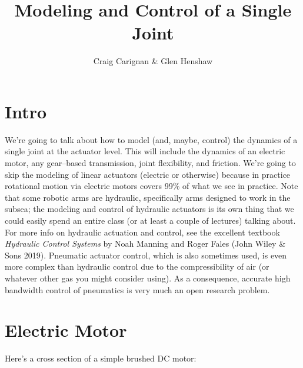 \documentclass[]{article}
\title{Modeling and Control of a Single Joint}
\author{Craig Carignan \& Glen Henshaw}
\begin{document}
\maketitle

\section{Intro}
We're going to talk about how to model (and, maybe, control) the dynamics of a single joint at the actuator level. This will include the dynamics of an electric motor, any gear--based transmission, joint flexibility, and friction. We're going to skip the modeling of linear actuators (electric or otherwise) because in practice rotational motion via electric motors covers 99\% of what we see in practice. Note that some robotic arms are hydraulic, specifically arms designed to work in the subsea; the modeling and control of hydraulic actuators is its own thing that we could easily spend an entire class (or at least a couple of lectures) talking about. For more info on hydraulic actuation and control, see the excellent textbook \textit{Hydraulic Control Systems} by Noah Manning and Roger Fales (John Wiley \& Sons 2019). Pneumatic actuator control, which is also sometimes used, is even more complex than hydraulic control due to the compressibility of air (or whatever other gas you might consider using). As a consequence, accurate high bandwidth control of pneumatics is very much an open research problem.

\section{Electric Motor}
Here's a cross section of a simple brushed DC motor:
\begin{figure}[h!]
	\centering
\end{figure}
\end{document}
